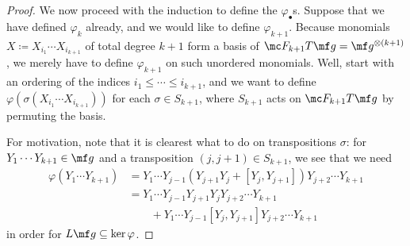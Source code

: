 \documentclass[../notes.tex]{subfiles}
\begin{document}
\begin{proof}
	We now proceed with the induction to define the $\varphi_\bullet$s. Suppose that we have defined $\varphi_k$ already, and we would like to define $\varphi_{k+1}$. Because monomials $X\coloneqq X_{i_1}\cdots X_{i_{k+1}}$ of total degree $k+1$ form a basis of $\mc F_{k+1}T\mf g=\mf g^{\otimes(k+1)}$, we merely have to define $\varphi_{k+1}$ on such unordered monomials. Well, start with an ordering of the indices $i_1\le\cdots\le i_{k+1}$, and we want to define $\varphi(\sigma(X_{i_1}\cdots X_{i_{k+1}}))$ for each $\sigma\in S_{k+1}$, where $S_{k+1}$ acts on $\mc F_{k+1}T\mf g$ by permuting the basis.
	
	For motivation, note that it is clearest what to do on transpositions $\sigma$: for $Y_1\cdots Y_{k+1}\in\mf g$ and a transposition $(j,j+1)\in S_{k+1}$, we see that we need
	\begin{align*}
		\varphi(Y_1\cdots Y_{k+1}) &= Y_1\cdots Y_{j-1}(Y_{j+1}Y_j+[Y_j,Y_{j+1}])Y_{j+2}\cdots Y_{k+1} \\
		&= Y_1\cdots Y_{j-1}Y_{j+1}Y_jY_{j+2}\cdots Y_{k+1} \\
		&\qquad+Y_1\cdots Y_{j-1}[Y_j,Y_{j+1}]Y_{j+2}\cdots Y_{k+1}
	\end{align*}
	in order for $L\mf g\subseteq\ker\varphi$.


\end{proof}
\end{document}
